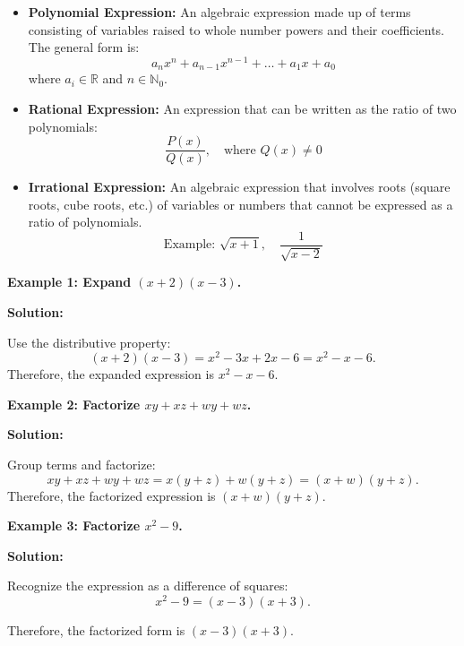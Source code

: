 \begin{itemize}
\item \textbf{Polynomial Expression:} An algebraic expression made up of terms consisting of variables raised to whole number powers and their coefficients. The general form is:
\[
a_nx^n + a_{n-1}x^{n-1} + \dots + a_1x + a_0
\]
where \(a_i \in \mathbb{R}\) and \(n \in \mathbb{N}_0\).

\item \textbf{Rational Expression:} An expression that can be written as the ratio of two polynomials:
\[
\frac{P(x)}{Q(x)}, \quad \text{where } Q(x) \neq 0
\]

\item \textbf{Irrational Expression:} An algebraic expression that involves roots (square roots, cube roots, etc.) of variables or numbers that cannot be expressed as a ratio of polynomials.  
\[
\text{Example: } \sqrt{x + 1}, \quad \frac{1}{\sqrt{x - 2}}
\]


\end{itemize}

\begin{flushleft}
\textbf{Example 1: Expand $(x+2)(x-3)$.}

\vspace{0.5cm}
\textbf{Solution:}
\vspace{0.5cm}

Use the distributive property:
\[
(x+2)(x-3) = x^2 - 3x + 2x - 6 = x^2 - x - 6.
\]
Therefore, the expanded expression is $x^2 - x - 6$.
\end{flushleft}

\begin{flushleft}
\textbf{Example 2: Factorize $xy + xz + wy + wz$.}

\vspace{0.5cm}
\textbf{Solution:}
\vspace{0.5cm}

Group terms and factorize:
\[
xy + xz + wy + wz = x(y+z) + w(y+z) = (x+w)(y+z).
\]
Therefore, the factorized expression is $(x+w)(y+z)$.
\end{flushleft}

\begin{flushleft}
\textbf{Example 3: Factorize $x^2 - 9$.}

\vspace{0.5cm}
\textbf{Solution:}
\vspace{0.5cm}

Recognize the expression as a difference of squares:
\[
x^2 - 9 = (x - 3)(x + 3).
\]

Therefore, the factorized form is $(x - 3)(x + 3)$.
\end{flushleft}

